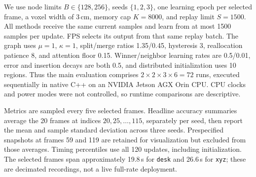 We use node limits $B\in\{128,256\}$, seeds $\{1,2,3\}$, one learning epoch per selected frame, a voxel width of 3\,cm, memory cap $K=8000$, and replay limit $S=1500$. All methods receive the same current samples and learn from at most 1500 samples per update. FPS selects its output from that same replay batch. The graph uses $\mu=1$, $\kappa=1$, split/merge ratios 1.35/0.45, hysteresis 3, reallocation patience 8, and attention floor 0.15. Winner/neighbor learning rates are 0.5/0.01, error and insertion decays are both 0.5, and distributed initialization uses 10 regions. Thus the main evaluation comprises $2\times2\times3\times6=72$ runs, executed sequentially in native C++ on an NVIDIA Jetson AGX Orin CPU. CPU clocks and power modes were not controlled, so runtime comparisons are descriptive.

Metrics are sampled every five selected frames. Headline accuracy summaries average the 20 frames at indices $20,25,\ldots,115$, separately per seed, then report the mean and sample standard deviation across three seeds. Prespecified snapshots at frames 59 and 119 are retained for visualization but excluded from those averages. Timing percentiles use all 120 updates, including initialization. The selected frames span approximately 19.8\,s for \texttt{desk} and 26.6\,s for \texttt{xyz}; these are decimated recordings, not a live full-rate deployment.
